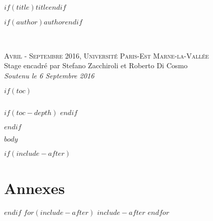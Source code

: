 \documentclass[$if(fontsize)$$fontsize$$endif$]{book} %
\begin{document}
\let\cleardoublepage\clearpage


\begingroup
\thispagestyle{empty}
\centering
\vspace*{5cm}
\par\normalfont\fontsize{35}{35}\sffamily\selectfont
\textbf{$if(title)$$title$$endif$}\\
{\LARGE }\par %
\vspace*{1cm}
{\Huge $if(author)$$author$$endif$}\par %
\endgroup


\newpage
~\vfill
\thispagestyle{empty}

\noindent \textsc{Avril - Septembre 2016, Université Paris-Est Marne-la-Vallée}\\

\noindent Stage encadré par Stefano Zacchiroli et Roberto Di Cosmo\\ %

\noindent \textit{Soutenu le 6 Septembre 2016} %


$if(toc)$

\pagestyle{empty} %

\clearpage{}
\paragraph{}
\newpage{}



\renewcommand\contentsname{Table des Matières}
\renewcommand{\bibname}{Bibliographie}
$if(toc-depth)$
\setcounter{tocdepth}{$toc-depth$}
$endif$
\tableofcontents%


\pagestyle{fancy} %
$endif$


$body$

\appendix

$if(include-after)$
\chapter{Annexes}
$endif$
$for(include-after)$
$include-after$
$endfor$
\end{document}

